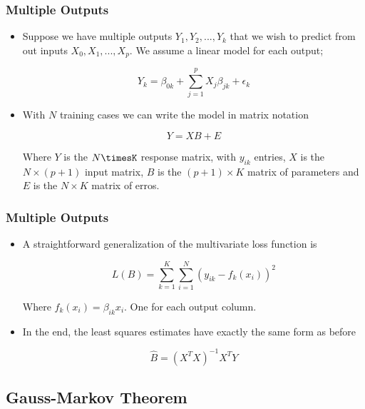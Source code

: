 \begin{frame}
    \frametitle{Multiple Outputs}
 
    \begin{itemize}
        \item Suppose we have multiple outputs $Y_1, Y_2, ..., Y_k$ that we wish
        to predict from out inputs $X_0, X_1, ..., X_p$. We assume a linear model
        for each output;

        $$Y_k = \beta_{0k} + \sum_{j=1}^{p}X_j\beta_{jk} + \epsilon_k$$

        \item With $N$ training cases we can write the model in matrix notation

        $$Y =  XB + E$$

        Where $Y$ is the $N\timesK$ response matrix, with $y_{ik}$ entries, $X$ is 
        the $N\times(p+1)$ input matrix, $B$ is the $(p+1)\times K$ matrix of 
        parameters and $E$ is the $N\times K$ matrix of erros.
    \end{itemize}

\end{frame}


\begin{frame}
    \frametitle{Multiple Outputs}
 
    \begin{itemize}
        \item A straightforward generalization of the multivariate loss function is

        $$L(B) = \sum_{k=1}^K\sum_{i=1}^N\left(y_{ik} - f_k(x_i)\right)^2$$

        Where $f_k(x_i) = \beta_{ik}x_i$. One for each output column.

        \item In the end, the least squares estimates have exactly the same form as before 

        $$\hat{B} = (X^TX)^{-1}X^TY$$
       
    \end{itemize}

\end{frame}



\subsection{Gauss-Markov Theorem}

